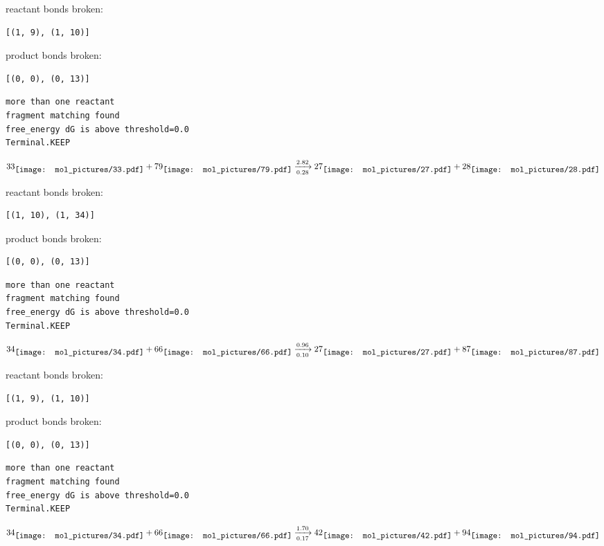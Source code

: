 \documentclass{article}
\begin{document}
reactant bonds broken:\begin{verbatim}
[(1, 9), (1, 10)]
\end{verbatim}
product bonds broken:\begin{verbatim}
[(0, 0), (0, 13)]
\end{verbatim}




\vspace{1cm}
\begin{verbatim}
more than one reactant
fragment matching found
free_energy dG is above threshold=0.0
Terminal.KEEP
\end{verbatim}
$$
33
\raisebox{-.5\height}{\texttt{[image: mol\_pictures/33.pdf]}}
+
79
\raisebox{-.5\height}{\texttt{[image: mol\_pictures/79.pdf]}}
\xrightarrow[0.28]{2.82}
27
\raisebox{-.5\height}{\texttt{[image: mol\_pictures/27.pdf]}}
+
28
\raisebox{-.5\height}{\texttt{[image: mol\_pictures/28.pdf]}}
$$


reactant bonds broken:\begin{verbatim}
[(1, 10), (1, 34)]
\end{verbatim}
product bonds broken:\begin{verbatim}
[(0, 0), (0, 13)]
\end{verbatim}




\vspace{1cm}
\begin{verbatim}
more than one reactant
fragment matching found
free_energy dG is above threshold=0.0
Terminal.KEEP
\end{verbatim}
$$
34
\raisebox{-.5\height}{\texttt{[image: mol\_pictures/34.pdf]}}
+
66
\raisebox{-.5\height}{\texttt{[image: mol\_pictures/66.pdf]}}
\xrightarrow[0.10]{0.96}
27
\raisebox{-.5\height}{\texttt{[image: mol\_pictures/27.pdf]}}
+
87
\raisebox{-.5\height}{\texttt{[image: mol\_pictures/87.pdf]}}
$$


reactant bonds broken:\begin{verbatim}
[(1, 9), (1, 10)]
\end{verbatim}
product bonds broken:\begin{verbatim}
[(0, 0), (0, 13)]
\end{verbatim}




\vspace{1cm}
\begin{verbatim}
more than one reactant
fragment matching found
free_energy dG is above threshold=0.0
Terminal.KEEP
\end{verbatim}
$$
34
\raisebox{-.5\height}{\texttt{[image: mol\_pictures/34.pdf]}}
+
66
\raisebox{-.5\height}{\texttt{[image: mol\_pictures/66.pdf]}}
\xrightarrow[0.17]{1.70}
42
\raisebox{-.5\height}{\texttt{[image: mol\_pictures/42.pdf]}}
+
94
\raisebox{-.5\height}{\texttt{[image: mol\_pictures/94.pdf]}}
$$
\end{document}
